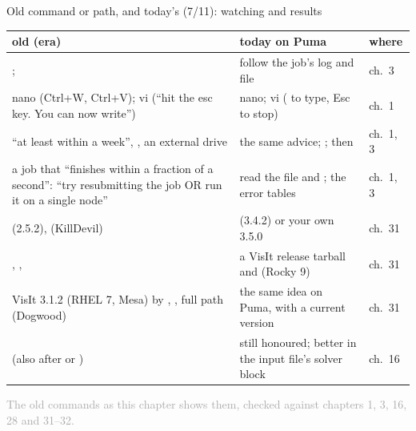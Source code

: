 \documentclass[aspectratio=169,11pt]{beamer}
\newcommand{\sourcecredit}[1]{\vfill\begin{flushright}\tiny\textcolor{DarkGray}{#1}\end{flushright}}
\begin{document}
\begin{frame}{Old command or path, and today's (7/11): watching and results}
\label{fr:map4}
\scriptsize
\renewcommand{\arraystretch}{1.1}
\setlength{\tabcolsep}{3pt}
\begin{tabular}{@{}L{0.43\textwidth}L{0.42\textwidth}L{0.1\textwidth}@{}}
\toprule
old (era) & today on Puma & where \\
\midrule
{};  & follow the job's log and  file & ch.\ 3 \\
nano (Ctrl+W, Ctrl+V); vi (``hit the esc key. You can now write'') & nano; vi ( to type, Esc to stop) & ch.\ 1 \\
``at least within a week'', , an external drive & the same advice; ; then  & ch.\ 1, 3 \\
a job that ``finishes within a fraction of a second'': ``try resubmitting the job OR run it on a single node'' & read the  file and ; the error tables & ch.\ 1, 3 \\
 (2.5.2),  (KillDevil) &  (3.4.2) or your own 3.5.0 & ch.\ 31 \\
, ,  & a VisIt release tarball and  (Rocky 9) & ch.\ 31 \\
VisIt 3.1.2 (RHEL 7, Mesa) by , , full path (Dogwood) & the same idea on Puma, with a current version & ch.\ 31 \\
 (also after  or ) & still honoured; better in the input file's solver block & ch.\ 16 \\
\bottomrule
\end{tabular}
\sourcecredit{The old commands as this chapter shows them, checked against chapters 1, 3, 16, 28 and 31--32.}
\end{frame}
\end{document}
